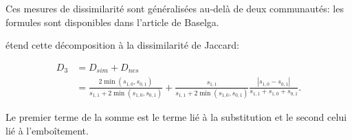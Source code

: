 \documentclass[
  11pt,
  french,
  a4paper,
  extrafontsizes,onecolumn,openright
  ]{memoir}
\begin{document}
Ces mesures de dissimilarité sont généralisées au-delà de deux communautés: les formules sont disponibles dans l'article de Baselga.

\textcite{Baselga2012} étend cette décomposition à la dissimilarité de Jaccard:

\begin{align}
  \label{eq:DNesReplBJ}
  D_3
  &= D_{sim} + D_{nes} \\
  &= \frac{2\min(s_{1,0},s_{0,1})}{s_{1,1}+2\min(s_{1,0},s_{0,1})}
  + \frac{s_{1,1}}{s_{1,1}+2\min(s_{1,0},s_{0,1})}\frac{|s_{1,0}-s_{0,1}|}{s_{1,1}+s_{1,0}+s_{0,1}}.
\end{align}

Le premier terme de la somme est le terme lié à la substitution et le second celui lié à l'emboîtement.



\scriptsize
\end{document}
